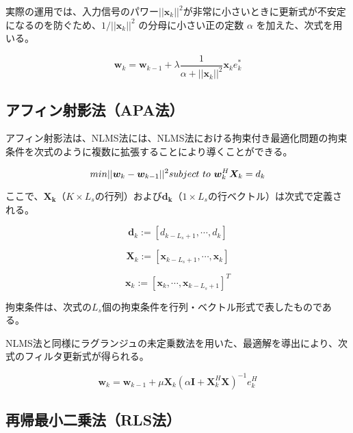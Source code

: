実際の運用では、入力信号のパワー\(||\bm{x}_k||^2\)が非常に小さいときに更新式が不安定になるのを防ぐため、\(
1 / ||{}\bm{x}_k||^2 \)
の分母に小さい正の定数 \(\alpha\) を加えた、次式を用いる。

\begin{equation}
\bm{w}_k = \bm{w}_{k-1} + \lambda \frac{1}{\alpha + ||\bm{x}_k||^2} \bm{x}_k e_k^*
\end{equation}

\subsection{アフィン射影法（APA法）}\label{apa}

アフィン射影法は、NLMS法には、NLMS法における拘束付き最適化問題の拘束条件を次式のように複数に拡張することにより導くことができる。

\begin{equation}
min ||\bm{w}_k - \bm{w}_{k-1}||^2 \\ 
subject \ to \ \bm{w}_k^H \bm{X}_k = d_k
\end{equation}


ここで、\(\bm{X_k}\)（\(K \times L_s\)の行列）および\(\bm{d_k}\)（\(1 \times L_s\)の行ベクトル）は次式で定義される。


\begin{equation}
\bm{d}_k := [d_{k-L_s+1}, \cdots, d_k]
\end{equation}

\begin{equation}
\bm{X}_k := [\bm{x}_{k-L_s+1}, \cdots, \bm{x}_k]
\end{equation}

\begin{equation}
\bm{x}_k := [\bm{x}_{k}, \cdots, \bm{x}_{k-L_s+1}]^T
\end{equation}

拘束条件は、次式の\(L_s\)個の拘束条件を行列・ベクトル形式で表したものである。

NLMS法と同様にラグランジュの未定乗数法を用いた、最適解を導出により、次式のフィルタ更新式が得られる。

\begin{equation}
\bm{w}_k = \bm{w}_{k-1} + \mu \bm{X}_k ( \alpha \bm{I} + \bm{X}_k^H \bm{X} )^{-1} e_k^H
\end{equation}



\subsection{再帰最小二乗法（RLS法）}\label{rls}

